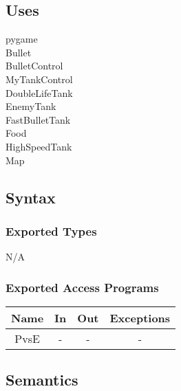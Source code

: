 \documentclass[12pt, titlepage]{article}
\begin{document}
        \subsection{Uses}
        pygame\\
        Bullet \\
        BulletControl \\
        MyTankControl \\
        DoubleLifeTank \\
        EnemyTank \\
        FastBulletTank \\
        Food \\
        HighSpeedTank \\
        Map\\
		\subsection{Syntax}
		\subsubsection{Exported Types}
		N/A
		\subsubsection{Exported Access Programs}
				\begin{tabular}[pos]{|c|c|c|c|}
					
					\hline
					\textbf{Name}& \textbf{In} & \textbf{Out} & \textbf{Exceptions} \\ \hline
					PvsE & - & - & - \\ \hline
			    \end{tabular}
		
		\subsection{Semantics}
\end{document}
